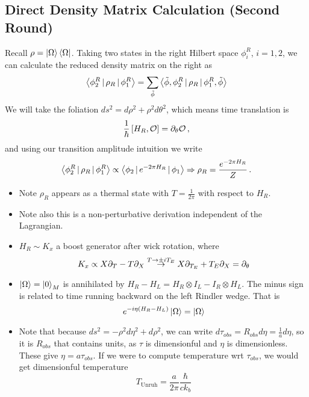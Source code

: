\documentclass{article}
\begin{document}
\subsection{Direct Density Matrix Calculation (Second Round)}
Recall $\rho = \ket{\Omega} \bra{\Omega}$. Taking two states in the right Hilbert space $\phi_i^R$, $i=1,2$, we can calculate the reduced density matrix on the right as 
\begin{align*}
	\pangle{\phi_2^R \, | \, \rho_R \, | \, \phi_1^R} = \sum_{\tilde{\phi}} \pangle{\tilde{\phi}, \phi_2^R \, | \, \rho_R \, | \, \phi_1^R , \tilde{\phi}}
\end{align*}
We will take the foliation $ds^2 = d\rho^2 + \rho^2 d \theta^2$, which means time translation is 
\[
\frac{1}{\hbar} \comm[H_R]{\mc{O}} = \del_\theta \mc{O} \, , 
\]
and using our transition amplitude intuition we write 
\[
\pangle{\phi_2^R \, | \, \rho_R \, | \, \phi_1^R} \propto \pangle{\phi_2 \, | \, e^{-2\pi H_R} \, | \, \phi_1} \Rightarrow \rho_R = \frac{e^{-2\pi H_R}}{Z} \, .
\]
\begin{remark}
	\begin{itemize}
		\item Note $\rho_R$ appears as a thermal state with $T = \frac{1}{2\pi}$ with respect to $H_R$.
		\item Note also this is a non-perturbative derivation independent of the Lagrangian.
		\item $H_R \sim K_x$ a boost generator after wick rotation, where 
		\[
		K_x \propto X \del_T - T \del_X \overset{T \to \pm i T_E}{\to} X \del_{T_E} + {T_E} \del_X = \del_\theta
		\] 
		\item $\ket{\Omega} = \ket{0}_M$ is annihilated by $H_R-H_L = H_R \otimes I_L - I_R \otimes H_L$. The minus sign is related to time running backward on the left Rindler wedge. That is 
		\[
		e^{-i\eta (H_R - H_L)} \ket{\Omega} = \ket{\Omega}
		\]
		\item Note that because $ds^2 = -\rho^2 d \eta^2 + d \rho^2$, we can write $d\tau_{obs} = R_{obs} d \eta = \frac{1}{a} d \eta$, so it is $R_{obs}$ that contains units, as $\tau$ is dimensionful and $\eta$ is dimensionless. These give $\eta = a \tau_{obs}$. If we were to compute temperature wrt $\tau_{obs}$, we would get dimensionful temperature 
		\[
		T_{\text{Unruh}} = \frac{a}{2 \pi} \frac{\hbar}{c k_b} 
		\] 
	\end{itemize}
\end{remark}

\end{document}
